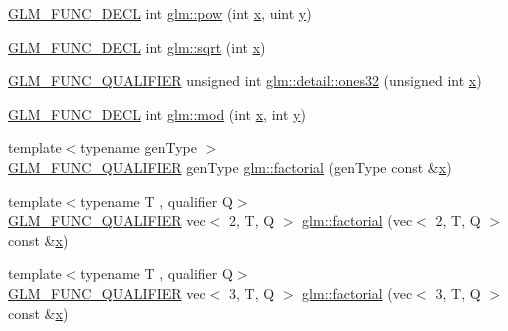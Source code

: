 \begin{DoxyCompactItemize}
\item 
\mbox{\hyperlink{setup_8hpp_ab2d052de21a70539923e9bcbf6e83a51}{G\+L\+M\+\_\+\+F\+U\+N\+C\+\_\+\+D\+E\+CL}} int \mbox{\hyperlink{group__gtx__integer_ga4937910d5d82dfd9c4bab3da7ff75399}{glm\+::pow}} (int \mbox{\hyperlink{_s_d_l__opengl_8h_ad0e63d0edcdbd3d79554076bf309fd47}{x}}, uint \mbox{\hyperlink{_s_d_l__opengl_8h_a1675d9d7bb68e1657ff028643b4037e3}{y}})
\item 
\mbox{\hyperlink{setup_8hpp_ab2d052de21a70539923e9bcbf6e83a51}{G\+L\+M\+\_\+\+F\+U\+N\+C\+\_\+\+D\+E\+CL}} int \mbox{\hyperlink{group__gtx__integer_ga78e2e68330e91d350fcfc2f4831cad12}{glm\+::sqrt}} (int \mbox{\hyperlink{_s_d_l__opengl_8h_ad0e63d0edcdbd3d79554076bf309fd47}{x}})
\item 
\mbox{\hyperlink{setup_8hpp_a33fdea6f91c5f834105f7415e2a64407}{G\+L\+M\+\_\+\+F\+U\+N\+C\+\_\+\+Q\+U\+A\+L\+I\+F\+I\+ER}} unsigned int \mbox{\hyperlink{namespaceglm_1_1detail_a2699e3b3ea6ad8d4bb99aed56761582c}{glm\+::detail\+::ones32}} (unsigned int \mbox{\hyperlink{_s_d_l__opengl_8h_ad0e63d0edcdbd3d79554076bf309fd47}{x}})
\item 
\mbox{\hyperlink{setup_8hpp_ab2d052de21a70539923e9bcbf6e83a51}{G\+L\+M\+\_\+\+F\+U\+N\+C\+\_\+\+D\+E\+CL}} int \mbox{\hyperlink{group__gtx__integer_gab9d22df91aac4d9eb925a4910f556f1b}{glm\+::mod}} (int \mbox{\hyperlink{_s_d_l__opengl_8h_ad0e63d0edcdbd3d79554076bf309fd47}{x}}, int \mbox{\hyperlink{_s_d_l__opengl_8h_a1675d9d7bb68e1657ff028643b4037e3}{y}})
\item 
{\footnotesize template$<$typename gen\+Type $>$ }\\\mbox{\hyperlink{setup_8hpp_a33fdea6f91c5f834105f7415e2a64407}{G\+L\+M\+\_\+\+F\+U\+N\+C\+\_\+\+Q\+U\+A\+L\+I\+F\+I\+ER}} gen\+Type \mbox{\hyperlink{group__gtx__integer_ga8cbd3120905f398ec321b5d1836e08fb}{glm\+::factorial}} (gen\+Type const \&\mbox{\hyperlink{_s_d_l__opengl_8h_ad0e63d0edcdbd3d79554076bf309fd47}{x}})
\item 
{\footnotesize template$<$typename T , qualifier Q$>$ }\\\mbox{\hyperlink{setup_8hpp_a33fdea6f91c5f834105f7415e2a64407}{G\+L\+M\+\_\+\+F\+U\+N\+C\+\_\+\+Q\+U\+A\+L\+I\+F\+I\+ER}} vec$<$ 2, T, Q $>$ \mbox{\hyperlink{namespaceglm_af73a83e2217df256752550778ff86955}{glm\+::factorial}} (vec$<$ 2, T, Q $>$ const \&\mbox{\hyperlink{_s_d_l__opengl_8h_ad0e63d0edcdbd3d79554076bf309fd47}{x}})
\item 
{\footnotesize template$<$typename T , qualifier Q$>$ }\\\mbox{\hyperlink{setup_8hpp_a33fdea6f91c5f834105f7415e2a64407}{G\+L\+M\+\_\+\+F\+U\+N\+C\+\_\+\+Q\+U\+A\+L\+I\+F\+I\+ER}} vec$<$ 3, T, Q $>$ \mbox{\hyperlink{namespaceglm_a786538577ea2e09359200d2500791041}{glm\+::factorial}} (vec$<$ 3, T, Q $>$ const \&\mbox{\hyperlink{_s_d_l__opengl_8h_ad0e63d0edcdbd3d79554076bf309fd47}{x}})

\end{DoxyCompactItemize}
